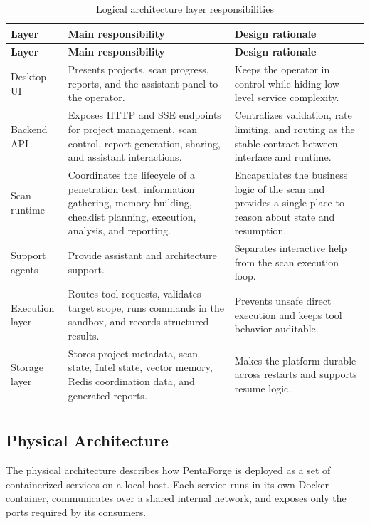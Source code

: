 \documentclass[12pt,a4paper]{report}
\begin{document}
\begin{longtable}{|p{}|p{}|p{}|}
\hline
\textbf{Layer} & \textbf{Main responsibility} & \textbf{Design rationale} \\
\hline
\endfirsthead
\hline
\textbf{Layer} & \textbf{Main responsibility} & \textbf{Design rationale} \\
\hline
\endhead
Desktop UI & Presents projects, scan progress, reports, and the assistant panel to
the operator. & Keeps the operator in control while hiding low-level service
complexity. \\
\hline
Backend API & Exposes HTTP and SSE endpoints for project management, scan control,
report generation, sharing, and assistant interactions. & Centralizes validation,
rate limiting, and routing as the stable contract between interface and runtime. \\
\hline
Scan runtime & Coordinates the lifecycle of a penetration test: information
gathering, memory building, checklist planning, execution, analysis, and reporting.
& Encapsulates the business logic of the scan and provides a single place to reason
about state and resumption. \\
\hline
Support agents & Provide assistant and architecture support. & Separates interactive
help from the scan execution loop. \\
\hline
Execution layer & Routes tool requests, validates target scope, runs commands in the
sandbox, and records structured results. & Prevents unsafe direct execution and
keeps tool behavior auditable. \\
\hline
Storage layer & Stores project metadata, scan state, Intel state, vector memory,
Redis coordination data, and generated reports. & Makes the platform durable across
restarts and supports resume logic. \\
\hline
\caption{Logical architecture layer responsibilities}
\label{tab:architecture_responsibilities}
\end{longtable}

\subsection{Physical Architecture}

The physical architecture describes how PentaForge is deployed as a set of
\mbox{containerized} services on a local host. Each service runs in its own Docker
container, communicates over a shared internal network, and exposes only the
ports required by its consumers.
\end{document}
